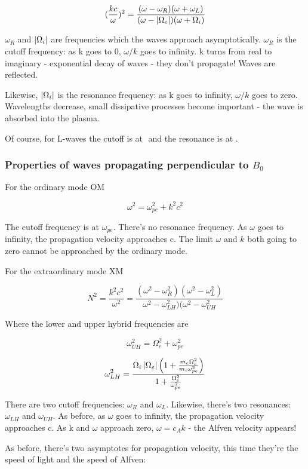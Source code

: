 \documentclass[PlasmaNotes.tex]{subfiles}
\begin{document}
\[(\frac{k c}{\omega})^2 = \frac{(\omega-\omega_R)(\omega+\omega_L)}{(\omega-\left| \Omega_e \right|)(\omega+\Omega_i)} \]

$\omega_R$ and $\left| \Omega_i \right|$ are frequencies which the waves approach asymptotically. $\omega_R$ is the cutoff frequency: as k goes to 0, $\omega/k$ goes to infinity. k turns from real to imaginary - exponential decay of waves - they don't propagate! Waves are reflected.

Likewise, $\left| \Omega_i \right|$ is the resonance frequency: as k goes to infinity, $\omega/k$ goes to zero. Wavelengths decrease, small dissipative processes become important - the wave is absorbed into the plasma.

Of course, for L-waves the cutoff is at $ $ and the resonance is at $ $.



\subsubsection{Properties of waves propagating perpendicular to $B_0$}

For the ordinary mode OM

\[ \omega^2 = \omega_{pe}^2 + k^2 c^2 \]

The cutoff frequency is at $\omega_{pe}$. There's no resonance frequency. As $\omega$ goes to infinity, the propagation velocity approaches c. The limit $\omega$ and $k$ both going to zero cannot be approached by the ordinary mode.

For the extraordinary mode XM

\[ N^2 = \frac{k^2c^2}{\omega^2} = \frac{(\omega^2-\omega_R^2)(\omega^2-\omega_L^2)}{\omega^2-\omega_{LH}^2)(\omega^2-\omega_{UH}^2} \]

Where the lower and upper hybrid frequencies are

\[ \omega^2_{UH} = \Omega_e^2 + \omega_{pe}^2 \]

\[ \omega^2_{LH} = \frac{\Omega_i \left| \Omega_e \right| \Big(1+\frac{m_e \Omega_e^2}{m_i\omega_{pe}^2}\Big)}{1+\frac{\Omega_e^2}{\omega_{pe}^2}} \]

There are two cutoff frequencies: $\omega_R$ and $\omega_L$. Likewise, there's two resonances: $\omega_{LH}$ and $\omega_{UH}$. As before, as $\omega$ goes to infinity, the propagation velocity approaches c. As k and $\omega$ approach zero, $\omega = c_A k$ - the Alfven velocity appears!

As before, there's two asymptotes for propagation velocity, this time they're the speed of light and the speed of Alfven:
\end{document}
